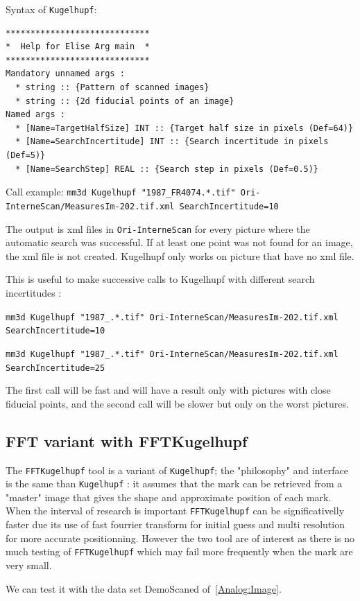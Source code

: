Syntax of {\tt Kugelhupf}:
\begin{verbatim}
*****************************
*  Help for Elise Arg main  *
*****************************
Mandatory unnamed args : 
  * string :: {Pattern of scanned images}
  * string :: {2d fiducial points of an image}
Named args : 
  * [Name=TargetHalfSize] INT :: {Target half size in pixels (Def=64)}
  * [Name=SearchIncertitude] INT :: {Search incertitude in pixels (Def=5)}
  * [Name=SearchStep] REAL :: {Search step in pixels (Def=0.5)}
\end{verbatim}

Call example:
{\tt mm3d Kugelhupf "1987\_FR4074.*.tif" Ori-InterneScan/MeasuresIm-202.tif.xml SearchIncertitude=10 }

The output is xml files in {\tt Ori-InterneScan} for every picture where the automatic search was successful.
If at least one point was not found for an image, the xml file is not created.
Kugelhupf only works on picture that have no xml file.

This is useful to make successive calls to Kugelhupf with different search incertitudes :

{\tt mm3d Kugelhupf "1987\_.*.tif" Ori-InterneScan/MeasuresIm-202.tif.xml SearchIncertitude=10}

{\tt mm3d Kugelhupf "1987\_.*.tif" Ori-InterneScan/MeasuresIm-202.tif.xml SearchIncertitude=25}


The first call will be fast and will have a result only with pictures with close fiducial points, and the second call will
be slower but only on the worst pictures.


\subsection{FFT variant with  FFTKugelhupf}

The {\tt FFTKugelhupf} tool is a variant of {\tt Kugelhupf}; the "philosophy" and interface is
the same than  {\tt Kugelhupf} : it assumes that the mark can be retrieved from a "master" image 
that gives  the shape and approximate position of each mark. When the interval of research
is important {\tt FFTKugelhupf} can be significativelly faster due its use of fast fourrier transform
for initial guess and multi resolution for more accurate positionning. However the two tool
are of interest as there is no much testing of   {\tt FFTKugelhupf} which may fail more frequently
when the mark are very small.

We can test it with the data set DemoScaned of~\ref{Analog:Image}.

